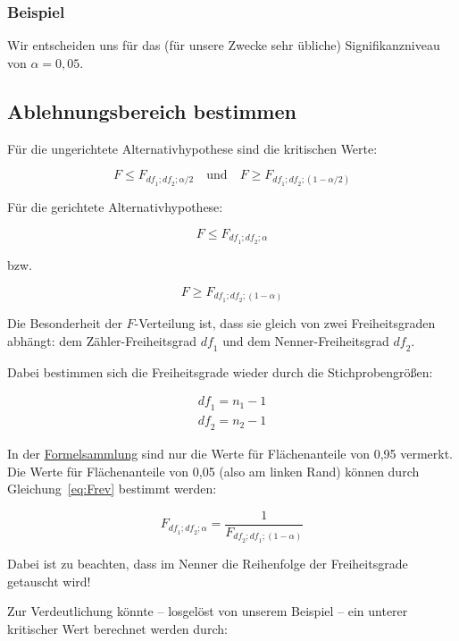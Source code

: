 \documentclass[
  11pt,
  ngerman,
  a4paper,
]{report}
\begin{document}
\hypertarget{beispiel-19}{%
\subsubsection{Beispiel}\label{beispiel-19}}

Wir entscheiden uns für das (für unsere Zwecke sehr übliche) Signifikanzniveau von \(\alpha=0{,}05\).

\hypertarget{ablehnungsbereich-bestimmen-3}{%
\subsection{Ablehnungsbereich bestimmen}\label{ablehnungsbereich-bestimmen-3}}

Für die ungerichtete Alternativhypothese sind die kritischen Werte:

\[
F \leq F_{\mathit{df}_1;\mathit{df}_2;\alpha/2} \quad \textrm{und} \quad F \geq F_{\mathit{df}_1;\mathit{df}_2;(1-\alpha/2)}
\label{eq:kritFu}
\]

Für die gerichtete Alternativhypothese:

\[
F \leq F_{\mathit{df}_1;\mathit{df}_2;\alpha}
\label{eq:kritFl}
\]

bzw.

\[
F \geq F_{\mathit{df}_1;\mathit{df}_2;(1-\alpha)}
\label{eq:kritFg}
\]

Die Besonderheit der \(F\)-Verteilung ist, dass sie gleich von zwei Freiheitsgraden abhängt: dem Zähler-Freiheitsgrad \(\mathit{df}_1\) und dem Nenner-Freiheitsgrad \(\mathit{df}_2\).

Dabei bestimmen sich die Freiheitsgrade wieder durch die Stichprobengrößen:

\[
\begin{aligned}
\mathit{df}_1=n_1-1\\
\mathit{df}_2=n_2-1
\end{aligned}
\label{eq:Fdfs}
\]

In der \protect\hyperlink{formeln}{Formelsammlung} sind nur die Werte für Flächenanteile von 0,95 vermerkt. Die Werte für Flächenanteile von 0,05 (also am linken Rand) können durch Gleichung~\eqref{eq:Frev} bestimmt werden:

\[
F_{\mathit{df}_1;\mathit{df}_2;\alpha}=\frac{1}{F_{\mathit{df}_2;\mathit{df}_1;(1-\alpha)}}
\label{eq:Frev}
\]

Dabei ist zu beachten, dass im Nenner die Reihenfolge der Freiheitsgrade getauscht wird!

Zur Verdeutlichung könnte -- losgelöst von unserem Beispiel -- ein unterer kritischer Wert berechnet werden durch:
\end{document}
